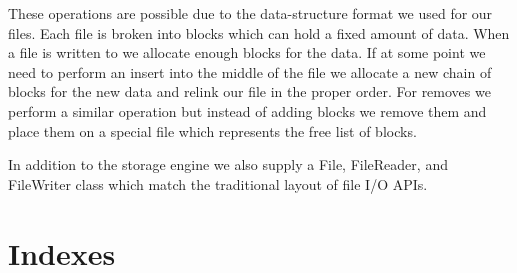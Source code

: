 \documentclass{article}
\begin{document}
These operations are possible due to the data-structure format we used for our files.
Each file is broken into blocks which can hold a fixed amount of data.
When a file is written to we allocate enough blocks for the data.
If at some point we need to perform an insert into the middle of the file we allocate
a new chain of blocks for the new data and relink our file in the proper order.
For removes we perform a similar operation but instead of adding blocks we remove them and 
place them on a special file which represents the free list of blocks.

In addition to the storage engine we also supply a File, FileReader, and FileWriter class which
match the traditional layout of file I/O APIs.

\section{Indexes}
\end{document}
